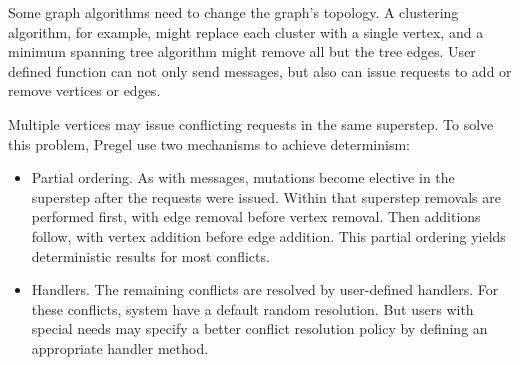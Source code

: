 

Some graph algorithms need to change the graph's topology.
A clustering algorithm, for example, might replace each
cluster with a single vertex, and a minimum spanning tree
algorithm might remove all but the tree edges.
User defined function can not only send messages, but also can
issue requests to add or remove vertices or edges.


Multiple vertices may issue conflicting requests in the same
superstep. To solve this problem, Pregel use two mechanisms to achieve
determinism:
\begin{itemize}
  \item Partial ordering. As with messages, mutations become elective in the superstep after the requests were
  issued. Within that superstep removals are performed first, with edge removal before vertex removal. Then additions follow, with vertex addition before edge addition. This partial ordering yields deterministic results for most conflicts.
  \item Handlers. The remaining conflicts are resolved by user-defined handlers. For these conflicts, system have a default random resolution. But users with special needs may specify a better conflict resolution policy by defining an appropriate handler method.
\end{itemize}